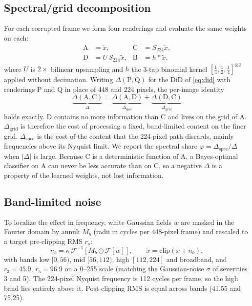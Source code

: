 \documentclass[conference]{IEEEtran}
\begin{document}
\subsection{Spectral/grid decomposition}
For each corrupted frame we form four renderings and evaluate the same weights on each:
\begin{align}
\mathrm{A}&=\tilde x, & \mathrm{C}&=S_{224}\tilde x,\nonumber\\
\mathrm{D}&=U\,S_{224}\tilde x, & \mathrm{B}&=h\ast\tilde x,
\end{align}
where $U$ is $2\times$ bilinear upsampling and $h$ the 3-tap binomial kernel $[\tfrac14,\tfrac12,\tfrac14]^{\otimes2}$ applied without decimation. Writing $\Delta(\mathrm{P},\mathrm{Q})$ for the DiD of \eqref{eq:did} with renderings P and Q in place of 448 and 224 pixels, the per-image identity
\begin{equation}
\underbrace{\Delta(\mathrm{A},\mathrm{C})}_{\Delta}=\underbrace{\Delta(\mathrm{A},\mathrm{D})}_{\Delta_{\mathrm{spec}}}+\underbrace{\Delta(\mathrm{D},\mathrm{C})}_{\Delta_{\mathrm{grid}}}\label{eq:decomp}
\end{equation}
holds exactly. D contains no more information than C and lives on the grid of A. $\Delta_{\mathrm{grid}}$ is therefore the cost of processing a fixed, band-limited content on the finer grid. $\Delta_{\mathrm{spec}}$ is the cost of the content that the 224-pixel path discards, mainly frequencies above its Nyquist limit. We report the spectral share $\varphi=\Delta_{\mathrm{spec}}/\Delta$ when $|\Delta|$ is large. Because C is a deterministic function of A, a Bayes-optimal classifier on A can never be less accurate than on C, so a negative $\Delta$ is a property of the learned weights, not lost information.

\subsection{Band-limited noise}
To localize the effect in frequency, white Gaussian fields $w$ are masked in the Fourier domain by annuli $M_b$ (radii in cycles per 448-pixel frame) and rescaled to a target pre-clipping RMS $r_s$:
\begin{equation}
n_b=\kappa\,\mathcal F^{-1}\!\left[M_b\odot\mathcal F[w]\right],\qquad \tilde x=\mathrm{clip}(x+n_b),
\end{equation}
with bands low $[0,56)$, mid $[56,112)$, high $[112,224]$ and broadband, and $r_3=45.9$, $r_5=96.9$ on a 0--255 scale (matching the Gaussian-noise $\sigma$ of severities 3 and 5). The 224-pixel Nyquist frequency is 112 cycles per frame, so the high band lies entirely above it. Post-clipping RMS is equal across bands (41.55 and 75.25).
\end{document}
